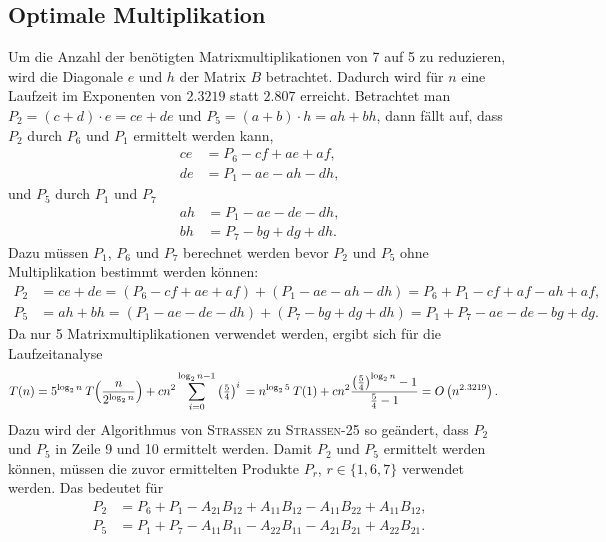 \documentclass{report}
\numberwithin{equation}{section}
\begin{document}
\subsection{Optimale Multiplikation}
Um die Anzahl der benötigten Matrixmultiplikationen von 7 auf 5 zu reduzieren, wird die Diagonale $e$ und $h$ der Matrix $B$ betrachtet. Dadurch wird für $n$ eine Laufzeit im Exponenten von $2.3219$ statt $2.807$ erreicht. Betrachtet man $P_2 = (c + d) \cdot e = ce + de$ und $P_5 = (a + b) \cdot h = ah + bh$, dann fällt auf, dass $P_2$ durch $P_6$ und $P_1$ ermittelt werden kann,
\begin{align*}
	ce &= P_6 - cf + ae + af, \\
	de &= P_1 - ae - ah - dh,
\end{align*}
und $P_5$ durch $P_1$ und $P_7$
\begin{align*}
	ah &= P_1 - ae - de - dh, \\
	bh &= P_7 - bg + dg + dh.
\end{align*}
Dazu müssen $P_1$, $P_6$ und $P_7$ berechnet werden bevor $P_2$ und $P_5$ ohne Multiplikation bestimmt werden können:
\begin{align*}
	P_2 &= ce + de = (P_6 - cf + ae + af) + (P_1 - ae - ah - dh) = P_6 + P_1 - cf + af - ah + af, \\
	P_5 &= ah + bh = (P_1 - ae - de - dh) + (P_7 - bg + dg + dh) = P_1 + P_7 - ae - de - bg + dg.
\end{align*}
Da nur 5 Matrixmultiplikationen verwendet werden, ergibt sich für die Laufzeitanalyse 
\begin{align*}
	\vphantom{\rule{0pt}{2.5ex}} T(n) &= 5^{\log_{2}n} \: T\Big(\frac{n}{2^{\log_{2}n}}\Big) + cn^2 \sum_{i = 0}^{\log_{2}n-1} \left(\tfrac{5}{4}\right)^i
	\vphantom{\rule{0pt}{2.5ex}} = n^{\log_{2}5} \: T(1) + cn^2 \frac{\left(\tfrac{5}{4}\right)^{\log_{2}n} - 1}{\tfrac{5}{4} - 1}
	\vphantom{\rule{0pt}{2.5ex}} = O\left(n^{2.3219}\right).
\end{align*}
Dazu wird der Algorithmus von \textsc{Strassen} zu \textsc{Strassen-25} so geändert, dass $P_2$ und $P_5$ in Zeile 9 und 10 ermittelt werden. Damit $P_2$ und $P_5$ ermittelt werden können, müssen die zuvor ermittelten Produkte $P_r$, $r \in \{1, 6, 7\}$ verwendet werden. Das bedeutet für 
\begin{align*}
	P_2 &= P_6 + P_1 - A_{21}B_{12} + A_{11}B_{12} - A_{11}B_{22} + A_{11}B_{12}, \\
	P_5 &= P_1 + P_7 - A_{11}B_{11} - A_{22}B_{11} - A_{21}B_{21} + A_{22}B_{21}.
\end{align*}
\end{document}
